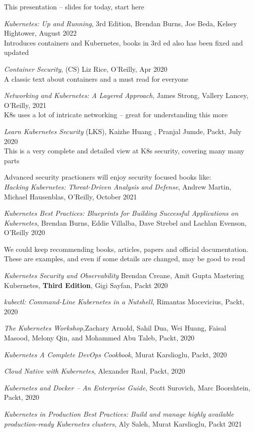 \documentclass[Screen16to9,17pt]{foils}
\begin{document}
\myquestionspage



\begin{list2}
\item This presentation -- slides for today, start here
\item \emph{Kubernetes: Up and Running}, 3rd Edition, Brendan Burns, Joe Beda, Kelsey Hightower,
August 2022\\
Introduces containers and Kubernetes, books in 3rd ed also has been fixed and updated
\item \emph{Container Security}, (CS) Liz Rice, O'Reilly, Apr 2020\\
A classic text about containers and a must read for everyone
\item \emph{Networking and Kubernetes: A Layered Approach}, James Strong, Vallery Lancey, O'Reilly, 2021\\
K8s uses a lot of intricate networking -- great for understanding this more
\item \emph{Learn Kubernetes Security} (LKS), Kaizhe Huang , Pranjal Jumde, Packt, July 2020\\
This is a very complete and detailed view at K8s security, covering many many parts
\item Advanced security practioners will enjoy security focused books like:\\
\emph{Hacking Kubernetes: Threat-Driven Analysis and Defense}, Andrew Martin, Michael Hausenblas, O'Reilly, October 2021
\item \emph{Kubernetes Best Practices: Blueprints for Building Successful Applications on Kubernetes}, Brendan Burns, Eddie Villalba, Dave Strebel and Lachlan Evenson, O'Reilly 2020
\end{list2}



We could keep recommending books, articles, papers and official documentation.
These are examples, and even if some details are changed, may be good to read
\begin{list2}
\item \emph{Kubernetes Security and Observability} Brendan Creane, Amit Gupta %
Mastering Kubernetes, {\bf Third Edition}, Gigi Sayfan, Packt 2020
\item \emph{kubectl: Command-Line Kubernetes in a Nutshell}, Rimantas Mocevicius, Packt, 2020
\item \emph{The Kubernetes Workshop},Zachary Arnold, Sahil Dua, Wei Huang, Faisal Masood, Melony Qin,
and Mohammed Abu Taleb, Packt, 2020
\item \emph{Kubernetes A Complete DevOps Cookbook}, Murat Karslioglu, Packt, 2020
\item \emph{Cloud Native with Kubernetes}, Alexander Raul, Packt, 2020
\item \emph{Kubernetes and Docker – An Enterprise Guide}, Scott Surovich, Marc Boorshtein, Packt, 2020
\item \emph{Kubernetes in Production Best Practices: Build and manage highly available production-ready
Kubernetes clusters}, Aly Saleh, Murat Karslioglu, Packt 2021
\end{list2}
\end{document}
